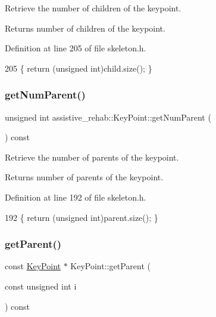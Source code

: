 Retrieve the number of children of the keypoint. 

\begin{DoxyReturn}{Returns}
number of children of the keypoint. 
\end{DoxyReturn}


Definition at line 205 of file skeleton.\+h.


\begin{DoxyCode}
205 \{ \textcolor{keywordflow}{return} (\textcolor{keywordtype}{unsigned} \textcolor{keywordtype}{int})child.size(); \}
\end{DoxyCode}
\mbox{\label{classassistive__rehab_1_1KeyPoint_acf31a6d7e9ae1be4aa992599435564ad}} 
\subsubsection{\texorpdfstring{get\+Num\+Parent()}{getNumParent()}}
{\footnotesize\ttfamily unsigned int assistive\+\_\+rehab\+::\+Key\+Point\+::get\+Num\+Parent (\begin{DoxyParamCaption}{ }\end{DoxyParamCaption}) const\hspace{0.3cm}{\ttfamily [inline]}}



Retrieve the number of parents of the keypoint. 

\begin{DoxyReturn}{Returns}
number of parents of the keypoint. 
\end{DoxyReturn}


Definition at line 192 of file skeleton.\+h.


\begin{DoxyCode}
192 \{ \textcolor{keywordflow}{return} (\textcolor{keywordtype}{unsigned} \textcolor{keywordtype}{int})parent.size(); \}
\end{DoxyCode}
\mbox{\label{classassistive__rehab_1_1KeyPoint_a0aa07ed9cc05471af65622fa05329cc3}} 
\subsubsection{\texorpdfstring{get\+Parent()}{getParent()}}
{\footnotesize\ttfamily const \hyperlink{classassistive__rehab_1_1KeyPoint}{Key\+Point} $\ast$ Key\+Point\+::get\+Parent (\begin{DoxyParamCaption}\item[{const unsigned int}]{i }\end{DoxyParamCaption}) const}



